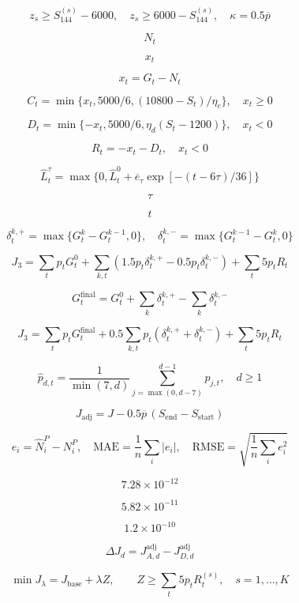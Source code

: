 \[
z_s\geq S_{144}^{(s)}-6000,\quad z_s\geq6000-S_{144}^{(s)},\quad\kappa=0.5\overline p
\]

\[
N_t
\]

\[
x_t
\]

\[
x_t=G_t-N_t
\]

\[
C_t=\min\{x_t,5000/6,(10800-S_t)/\eta_c\},\quad x_t\geq0
\]

\[
D_t=\min\{-x_t,5000/6,\eta_d(S_t-1200)\},\quad x_t<0
\]

\[
R_t=-x_t-D_t,\quad x_t<0
\]

\[
\widehat L_t^{\tau}=\max\{0,\widehat L_t^0+\overline e_{\tau}\exp[-(t-6\tau)/36]\}
\]

\[
\tau
\]

\[
t
\]

\[
\delta_t^{k,+}=\max\{G_t^k-G_t^{k-1},0\},\quad\delta_t^{k,-}=\max\{G_t^{k-1}-G_t^k,0\}
\]

\[
J_3=\sum_t p_tG_t^0+\sum_{k,t}(1.5p_t\delta_t^{k,+}-0.5p_t\delta_t^{k,-})+\sum_t5p_tR_t
\]

\[
G_t^{\mathrm{final}}=G_t^0+\sum_k\delta_t^{k,+}-\sum_k\delta_t^{k,-}
\]

\[
J_3=\sum_t p_tG_t^{\mathrm{final}}+0.5\sum_{k,t}p_t(\delta_t^{k,+}+\delta_t^{k,-})+\sum_t5p_tR_t
\]

\[
\widehat p_{d,t}=\frac{1}{\min(7,d)}\sum_{j=\max(0,d-7)}^{d-1}p_{j,t},\quad d\geq1
\]

\[
J_{\mathrm{adj}}=J-0.5\overline p\,(S_{\mathrm{end}}-S_{\mathrm{start}})
\]

\[
e_i=\widehat{N}_i^{P}-N_i^{P},\quad \mathrm{MAE}=\frac{1}{n}\sum_i|e_i|,\quad \mathrm{RMSE}=\sqrt{\frac{1}{n}\sum_i e_i^2}
\]

\[
7.28\times10^{-12}
\]

\[
5.82\times10^{-11}
\]

\[
1.2\times10^{-10}
\]

\[
\Delta J_d=J_{A,d}^{\mathrm{adj}}-J_{D,d}^{\mathrm{adj}}
\]

\[
\min J_{\lambda}=J_{\mathrm{base}}+\lambda Z,\qquad Z\geq\sum_t5p_tR_t^{(s)},\quad s=1,\ldots,K
\]